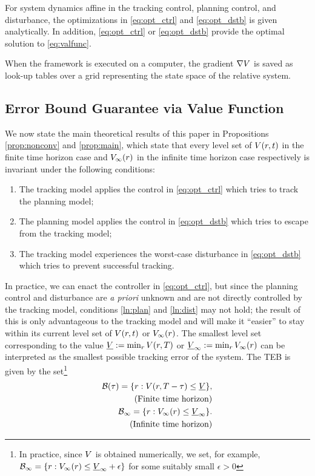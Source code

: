 For system dynamics affine in the tracking control, planning control, and disturbance, the optimizations in \eqref{eq:opt_ctrl} and \eqref{eq:opt_dstb} is given analytically.
In addition, \eqref{eq:opt_ctrl} or \eqref{eq:opt_dstb} provide the optimal solution to \eqref{eq:valfunc}.

When the framework is executed on a computer, the gradient $\nabla V$ is saved as look-up tables over a grid representing the state space of the relative system.

\subsection{Error Bound Guarantee via Value Function} \label{sec:proofs}
We now state the main theoretical results of this paper in Propositions \ref{prop:nonconv} and \ref{prop:main}, which state that every level set of $V(r, t)$ in the finite time horizon case and $V_\infty(r)$ in the infinite time horizon case respectively is invariant under the following conditions:
\begin{enumerate}
  \item The tracking model applies the control in \eqref{eq:opt_ctrl} which tries to track the planning model;
  \item The planning model applies the control in \eqref{eq:opt_dstb} which tries to escape from the tracking model; \label{ln:plan}
  \item The tracking model experiences the worst-case disturbance in \eqref{eq:opt_dstb} which tries to prevent successful tracking. \label{ln:dist}
\end{enumerate}

In practice, we can enact the controller in \eqref{eq:opt_ctrl}, but since the planning control and disturbance are \textit{a priori} unknown and are not directly controlled by the tracking model, conditions \ref{ln:plan} and \ref{ln:dist} may not hold; the result of this is only advantageous to the tracking model and will make it ``easier'' to stay within its current level set of $V(r, t)$ or $V_\infty(r)$. 
The smallest level set corresponding to the value $\underline{V} := \min_{r} V(r,T)$ or $\underline{V}_\infty := \min_{r} V_\infty(r)$ can be interpreted as the smallest possible tracking error of the system. 
The TEB is given by the set\footnote{In practice, since $V$ is obtained numerically, we set, for example, $\mathcal B_\infty = \{r: V_\infty(r) \le \underline{V}_\infty + \epsilon\}$ for some suitably small $\epsilon>0$}
\begin{subequations} \label{eq:TEB}
  \begin{align}
  \mathcal B(\tau) = \{r: V(r, T - \tau) \le \underline{V}\}, \\
  \quad \text{(Finite time horizon)} \nonumber\\
  \mathcal B_\infty = \{r: V_\infty(r) \le \underline{V}_\infty\}. \\
  \quad \text{(Infinite time horizon)} \nonumber
  \end{align}
\end{subequations}

